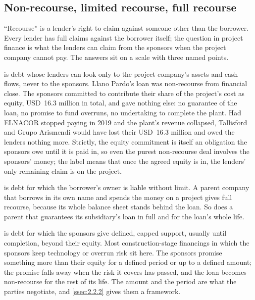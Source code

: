 \subsection{Non-recourse, limited recourse, full recourse}\label{ssec:2.2.1}

``Recourse'' is a lender's right to claim against someone other than the borrower. Every lender has full claims against the borrower itself; the question in project finance is what the lenders can claim from the sponsors when the project company cannot pay. The answers sit on a scale with three named points.

 is debt whose lenders can look only to the project company's assets and cash flows, never to the sponsors. Llano Pardo's loan was non-recourse from financial close. The sponsors committed to contribute their share of the project's cost as equity, USD~16.3 million in total, and gave nothing else: no guarantee of the loan, no promise to fund overruns, no undertaking to complete the plant. Had ELNACOR stopped paying in 2019 and the plant's revenue collapsed, Tallisford and Grupo Arismendi would have lost their USD~16.3 million and owed the lenders nothing more. Strictly, the equity commitment is itself an obligation the sponsors owe until it is paid in, so even the purest non-recourse deal involves the sponsors' money; the label means that once the agreed equity is in, the lenders' only remaining claim is on the project.

 is debt for which the borrower's owner is liable without limit. A parent company that borrows in its own name and spends the money on a project gives full recourse, because its whole balance sheet stands behind the loan. So does a parent that guarantees its subsidiary's loan in full and for the loan's whole life.

 is debt for which the sponsors give defined, capped support, usually until completion, beyond their equity. Most construction-stage financings in which the sponsors keep technology or overrun risk sit here. The sponsors promise something more than their equity for a defined period or up to a defined amount; the promise falls away when the risk it covers has passed, and the loan becomes non-recourse for the rest of its life. The amount and the period are what the parties negotiate, and \cref{ssec:2.2.2} gives them a framework.

